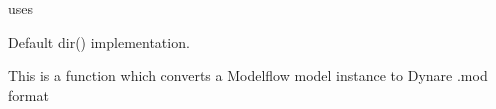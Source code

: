 \documentclass[letterpaper,10pt,english]{sphinxmanual}
\begin{document}
\begin{fulllineitems}
\begin{fulllineitems}
\sphinxAtStartPar
uses {\hyperref[\detokenize{vis/modelvis:modelvis.varvis}]{}}

\end{fulllineitems}


\begin{fulllineitems}
\label{\detokenize{core/modelclass:modelclass.Org_model_Mixin.__dir__}}
\pysigstartsignatures
{}
\pysigstopsignatures
\sphinxAtStartPar
Default dir() implementation.

\end{fulllineitems}


\begin{fulllineitems}
\label{\detokenize{core/modelclass:modelclass.Org_model_Mixin.todynare}}
\pysigstartsignatures
{}
\pysigstopsignatures
\sphinxAtStartPar
This is a function which converts a Modelflow  model instance to Dynare .mod format

\end{fulllineitems}


\end{fulllineitems}

\end{document}
